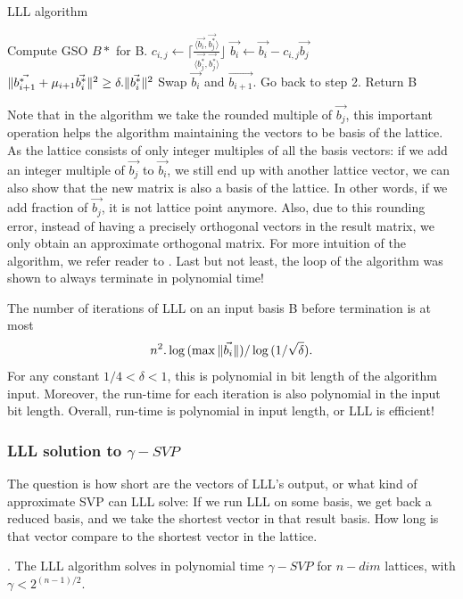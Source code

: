 \begin{algorithm}
  \caption{LLL algorithm}
  \label{alg:LLL}
  \begin{algorithmic}[1]
     \State Compute GSO $B*$ for B.  
     \State
    $c_{i,j} \gets \lceil{\frac{\langle \vec{b_i}, \vec{b_j^*} \rangle}{\langle
        \vec{b_j^*},\vec{b_j^*}\rangle}}\rfloor$ \State
    $\vec{b_i} \gets \vec{b_i} - c_{i,j}\vec{b_j}$ \EndFor \EndFor \If
    {$\Vert \vec{b_{i+1}^*}+\mu_{i+1}\vec{b_i^*} \Vert^2 \geq \delta
      . \Vert \vec{b_i^*} \Vert^2$} \State Swap $\vec{b_i}$ and $\vec{b_{i+1}}$.
    \State Go back to step 2.  \Else \State Return B \EndIf \EndProcedure
  \end{algorithmic}
\end{algorithm}
Note that in the algorithm we take the rounded multiple of $\vec{b_j}$, this
important operation helps the algorithm maintaining the vectors to be basis of
the lattice. As the lattice consists of only integer multiples of all the basis
vectors: if we add an integer multiple of $\vec{b_j}$ to $\vec{b_i}$, we still
end up with another lattice vector, we can also show that the new matrix is also
a basis of the lattice. In other words, if we add fraction of $\vec{b_j}$, it is
not lattice point anymore. Also, due to this rounding error, instead of having a
precisely orthogonal vectors in the result matrix, we only obtain an approximate
orthogonal matrix.  For more intuition of the algorithm, we refer reader to
\cite{lenstra1982factoring}. Last but not least, the loop of the algorithm was
shown to always terminate in polynomial time!
\begin{theorem}
   The number of iterations of LLL on an input basis B before
  termination is at most
  \[
    n^2.\log{(\max{\Vert \vec{b_i} \Vert})} / \log{(1/\sqrt{\delta})}.
  \]
  For any constant $1/4 < \delta < 1$, this is polynomial in bit length of the
  algorithm input. Moreover, the run-time for each iteration is also polynomial
  in the input bit length. Overall, run-time is polynomial in input length, or
  LLL is efficient!
  \label{theo:LLLRunTime}
\end{theorem}

\subsubsection{LLL solution to $\gamma-SVP$}
\label{sec:LLLsolution}
The question is how short are the vectors of LLL's output, or what kind of
approximate SVP can LLL solve: If we run LLL on some basis, we get back a
reduced basis, and we take the shortest vector in that result basis. How long is
that vector compare to the shortest vector in the lattice.
\begin{theorem}
  . The LLL algorithm solves in polynomial time
  $\gamma-SVP$ for $n-dim$ lattices, with $\gamma < 2^{(n-1)/2}$.
  \label{theo:LLLShortVector}
\end{theorem}


